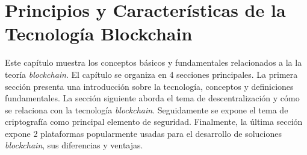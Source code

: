 \chapter{Principios y Características de la Tecnología Blockchain}
\label{capitulo2}

Este capítulo muestra los conceptos básicos y  fundamentales relacionados a la  la teoría \textit{blockchain}. El capítulo se organiza en 4 secciones principales. La primera sección presenta una introducción sobre la tecnología, conceptos y definiciones fundamentales. La sección siguiente aborda el tema  de descentralización y cómo se  relaciona con la tecnología \textit{blockchain}. Seguidamente se expone el tema de criptografía como principal elemento  de seguridad. Finalmente, la última sección expone 2 plataformas popularmente usadas para el desarrollo de soluciones \textit{blockchain}, sus diferencias y ventajas.






